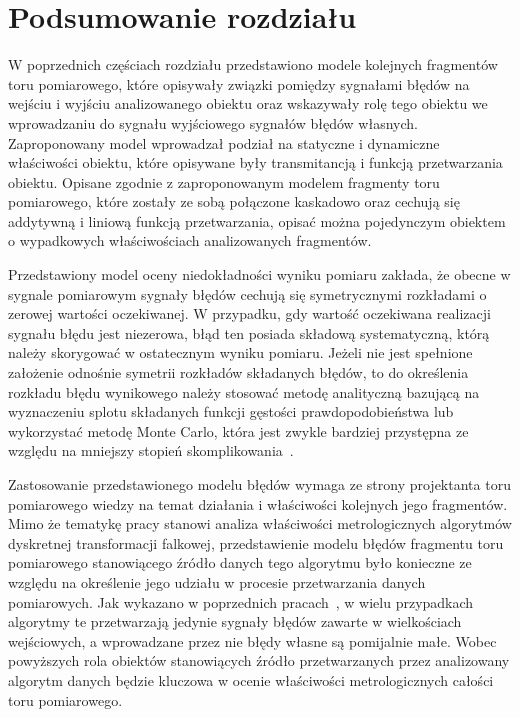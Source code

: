 \section{Podsumowanie rozdziału}

W poprzednich częściach rozdziału przedstawiono modele kolejnych fragmentów toru pomiarowego, które opisywały związki pomiędzy sygnałami błędów na wejściu i wyjściu analizowanego obiektu oraz wskazywały rolę tego obiektu we wprowadzaniu do sygnału wyjściowego sygnałów błędów własnych. Zaproponowany model wprowadzał podział na statyczne i dynamiczne właściwości obiektu, które opisywane były transmitancją i funkcją przetwarzania obiektu. Opisane zgodnie z zaproponowanym modelem fragmenty toru pomiarowego, które zostały ze sobą połączone kaskadowo oraz cechują się addytywną i liniową funkcją przetwarzania, opisać można pojedynczym obiektem o wypadkowych właściwościach analizowanych fragmentów.

Przedstawiony model oceny niedokładności wyniku pomiaru zakłada, że obecne w sygnale pomiarowym sygnały błędów cechują się symetrycznymi rozkładami o zerowej wartości oczekiwanej. W przypadku, gdy wartość oczekiwana realizacji sygnału błędu jest niezerowa, błąd ten posiada składową systematyczną, którą należy skorygować w ostatecznym wyniku pomiaru. Jeżeli nie jest spełnione założenie odnośnie symetrii rozkładów składanych błędów, to do określenia rozkładu błędu wynikowego należy stosować metodę analityczną bazującą na wyznaczeniu splotu składanych funkcji gęstości prawdopodobieństwa lub wykorzystać metodę Monte Carlo, która jest zwykle bardziej przystępna ze względu na mniejszy stopień skomplikowania~\cite{janssen_montecarlo, roj_annuncertainty}.

Zastosowanie przedstawionego modelu błędów wymaga ze strony projektanta toru pomiarowego wiedzy na temat działania i właściwości kolejnych jego fragmentów. Mimo że tematykę pracy stanowi analiza właściwości metrologicznych algorytmów dyskretnej transformacji falkowej, przedstawienie modelu błędów fragmentu toru pomiarowego stanowiącego źródło danych tego algorytmu było konieczne ze względu na określenie jego udziału w procesie przetwarzania danych pomiarowych. Jak wykazano w poprzednich pracach~\cite{auth_window, auth_random}, w wielu przypadkach algorytmy te przetwarzają jedynie sygnały błędów zawarte w wielkościach wejściowych, a wprowadzane przez nie błędy własne są pomijalnie małe. Wobec powyższych rola obiektów stanowiących źródło przetwarzanych przez analizowany algorytm danych będzie kluczowa w ocenie właściwości metrologicznych całości toru pomiarowego.

